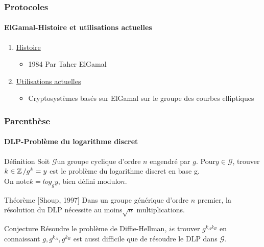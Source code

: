 \documentclass[10pt]{beamer}
\begin{document}
\begin{frame}
\frametitle{Protocoles}
\framesubtitle{ElGamal-Histoire et utilisations actuelles}
\begin{enumerate}
\item \underline{Histoire}
\begin{itemize}
\item 1984 Par Taher ElGamal
\end{itemize}
\item \underline{Utilisations actuelles}
\begin{itemize}
\item Cryptosystèmes basés sur ElGamal sur le groupe des courbes elliptiques
\end{itemize}
\end{enumerate}
\end{frame}

\begin{frame}
\frametitle{Parenthèse}
\framesubtitle{DLP-Problème du logarithme discret}
\begin{block}{Définition}
Soit $\mathcal{G}$\hspace{0.05cm}un groupe cyclique d'ordre \hspace{0.05cm}$n$\hspace{0.05cm} engendré par \hspace{0.05cm}$g$\hspace{0.05cm}. Pour\hspace{0.05cm}$y\in \mathcal{G}$\hspace{0.05cm}, trouver\hspace{0.05cm}$k\in \mathbb{Z}\hspace{0.05cm}/g^{k}=y$\hspace{0.05cm} est le problème du logarithme discret en base g.\\
On note\hspace{0.05cm}$k=log_{g}y$\hspace{0.05cm}, bien défini modulo\hspace{0.05cm}$n$. 
\end{block}
\begin{block}{Théorème [Shoup, 1997]}
Dans un groupe générique d'ordre \hspace{0.05cm}$n$\hspace{0.05cm} premier, la résolution du DLP nécessite au moins\hspace{0.05cm}$\sqrt{n}$\hspace{0.05cm} multiplications.
\end{block}
\begin{alertblock}{Conjecture}
Résoudre le problème de Diffie-Hellman, $ie$ trouver \hspace{0.05cm}$g^{k_{A}k_{B}}$\hspace{0.05cm} en connaissant \hspace{0.05cm}$g,g^{k_A},g^{k_B}$\hspace{0.05cm} est aussi difficile que de résoudre le DLP dans \hspace{0.05cm}$\mathcal{G}$.
\end{alertblock}
\end{frame}
\end{document}
